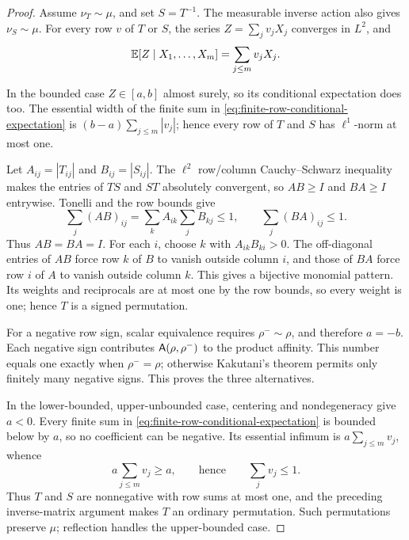 \begin{proof}
Assume \(\nu_T\sim\mu\), and set \(S=T^{-1}\).
The measurable inverse action also gives \(\nu_S\sim\mu\).
For every row \(v\) of \(T\) or \(S\), the series
\(Z=\sum_jv_jX_j\) converges in \(L^2\), and
\begin{equation}
 \mathbb E[Z\mid X_1,\ldots,X_m]=\sum_{j\leq m}v_jX_j.
 \label{eq:finite-row-conditional-expectation}
\end{equation}

In the bounded case \(Z\in[a,b]\) almost surely, so its conditional
expectation does too.  The essential width of the finite sum in
\eqref{eq:finite-row-conditional-expectation} is
\((b-a)\sum_{j\leq m}|v_j|\); hence every row of \(T\) and \(S\) has
\(\ell^1\)-norm at most one.

Let \(A_{ij}=|T_{ij}|\) and \(B_{ij}=|S_{ij}|\).
The \(\ell^2\) row/column Cauchy--Schwarz inequality makes the entries of
\(TS\) and \(ST\) absolutely convergent, so \(AB\ge I\) and \(BA\ge I\)
entrywise.  Tonelli and the row bounds give
\[
 \sum_j(AB)_{ij}
 =\sum_k A_{ik}\sum_jB_{kj}\leq1,
 \qquad
 \sum_j(BA)_{ij}\leq1.
\]
Thus \(AB=BA=I\).  For each \(i\), choose \(k\) with
\(A_{ik}B_{ki}>0\).  The off-diagonal entries of \(AB\) force row \(k\) of
\(B\) to vanish outside column \(i\), and those of \(BA\) force row \(i\)
of \(A\) to vanish outside column \(k\).  This gives a bijective monomial
pattern.  Its weights and reciprocals are at most one by the row bounds, so
every weight is one; hence \(T\) is a signed permutation.

For a negative row sign, scalar equivalence requires
\(\rho^-\sim\rho\), and therefore \(a=-b\).  Each negative sign contributes
\(\mathsf A(\rho,\rho^-)\) to the product affinity.  This number equals one
exactly when \(\rho^-=\rho\); otherwise Kakutani's theorem
\cite{kakutani1948equivalence} permits only finitely many negative signs.
This proves the three alternatives.

In the lower-bounded, upper-unbounded case, centering and nondegeneracy give
\(a<0\).  Every finite sum in
\eqref{eq:finite-row-conditional-expectation} is bounded below by \(a\), so
no coefficient can be negative.  Its essential infimum is
\(a\sum_{j\le m}v_j\), whence
\[
 a\sum_{j\leq m}v_j\geq a,
 \qquad\text{hence}\qquad \sum_jv_j\leq1.
\]
Thus \(T\) and \(S\) are nonnegative with row sums at most one, and the
preceding inverse-matrix argument makes \(T\) an ordinary permutation.  Such
permutations preserve \(\mu\); reflection handles the upper-bounded case.
\end{proof}

